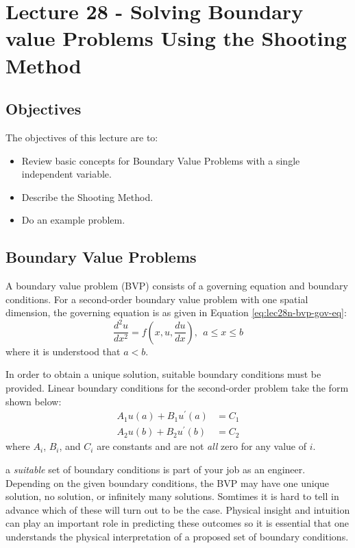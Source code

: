 \chapter{Lecture 28 - Solving Boundary value Problems Using the Shooting Method}
\label{ch:lec28n}
\section{Objectives}
The objectives of this lecture are to:
\begin{itemize}
\item Review basic concepts for Boundary Value Problems with a single independent variable.
\item Describe the Shooting Method.
\item Do an example problem.
\end{itemize}
\setcounter{lstannotation}{0}

\section{Boundary Value Problems}
A boundary value problem (BVP) consists of a governing equation and boundary conditions.  For a second-order boundary value problem with one spatial dimension, the governing equation is as given in Equation \ref{eq:lec28n-bvp-gov-eq}:
\begin{equation}
\frac{d^2 u}{dx^2} = f\left(x,u,\frac{du}{dx}\right), \ \ a\le x \le b
\label{eq:lec28n-bvp-gov-eq}
\end{equation}
where it is understood that $a<b$.  

In order to obtain a unique solution, suitable boundary conditions must be provided.  Linear boundary conditions for the second-order problem take the form shown below:
\begin{align*}
A_1u(a)+B_1u^{\prime}(a)&=C_1 \\
A_2u(b)+B_2u^{\prime}(b)&=C_2
\end{align*}
where $A_i$, $B_i$, and $C_i$ are constants and are not \emph{all} zero for any value of $i$.

 a \emph{suitable} set of boundary conditions is part of your job as an engineer.  Depending on the given boundary conditions, the BVP may have one unique solution, no solution, or infinitely many solutions. Somtimes it is hard to tell in advance which of these will turn out to be the case.  Physical insight and intuition can play an important role in predicting these outcomes so it is essential that one understands the physical interpretation of a proposed set of boundary conditions.


